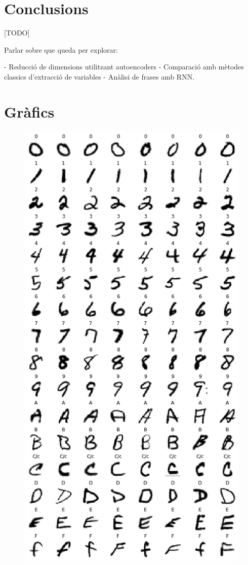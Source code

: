 \documentclass[12pt, spanish]{article}
\begin{document}
\section{Conclusions}

[TODO]

Parlar sobre que queda per explorar:

- Reducció de dimensions utilitzant autoencoders
- Comparació amb mètodes classics d'extracció de variables
- Anàlisi de frases amb RNN.

\clearpage
\appendix \label{sec:A}
\section{Gràfics}


\begin{figure}[hbt!]
\centering
\begin{minipage}{.33\textwidth}
  \centering
  \includegraphics[width=.95\linewidth]{images/samples_by_label1.png}

\end{minipage}
\end{figure}
\end{document}
